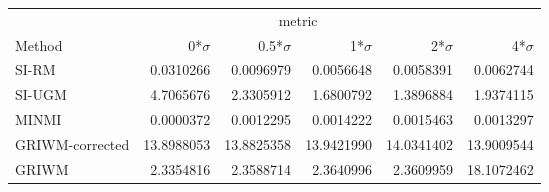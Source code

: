 
\begin{tabular}{lrrrrr}
\toprule
\multicolumn{1}{c}{ } & \multicolumn{4}{c}{metric} \\
\cmidrule(l{3pt}r{3pt}){2-5}
Method & 0*$\sigma$ & 0.5*$\sigma$ & 1*$\sigma$ & 2*$\sigma$ & 4*$\sigma$\\
\midrule
SI-RM & 0.0310266 & 0.0096979 & 0.0056648 & 0.0058391 & 0.0062744\\
SI-UGM & 4.7065676 & 2.3305912 & 1.6800792 & 1.3896884 & 1.9374115\\
MINMI & 0.0000372 & 0.0012295 & 0.0014222 & 0.0015463 & 0.0013297\\
GRIWM-corrected & 13.8988053 & 13.8825358 & 13.9421990 & 14.0341402 & 13.9009544\\
GRIWM & 2.3354816 & 2.3588714 & 2.3640996 & 2.3609959 & 18.1072462\\
\bottomrule
\end{tabular}
